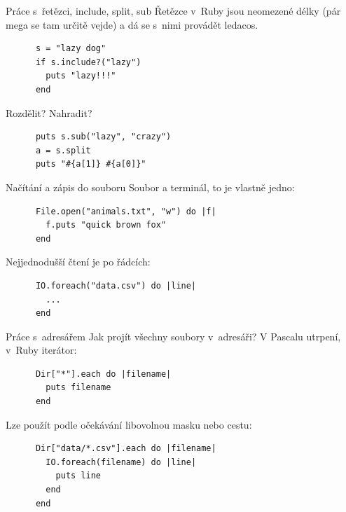 \documentclass{beamer}
\begin{document}
\begin{frame}[fragile]{Práce s~řetězci, include, split, sub}
  Řetězce v~Ruby jsou neomezené délky (pár mega se tam určitě vejde) a dá se s~nimi provádět ledacos.
  \begin{block}{}
    {\scriptsize \begin{verbatim}
      s = "lazy dog"
      if s.include?("lazy")
        puts "lazy!!!"
      end
    \end{verbatim}}
  \end{block}
  \pause
  Rozdělit? Nahradit?
  \begin{block}{}
    {\scriptsize \begin{verbatim}
      puts s.sub("lazy", "crazy")
      a = s.split
      puts "#{a[1]} #{a[0]}"
    \end{verbatim}}
  \end{block}
\end{frame}

\begin{frame}[fragile]{Načítání a zápis do souboru}
  Soubor a terminál, to je vlastně jedno:
  \begin{block}{}
    {\scriptsize \begin{verbatim}
      File.open("animals.txt", "w") do |f|
        f.puts "quick brown fox"
      end
    \end{verbatim}}
  \end{block}
  \pause
  Nejjednodušší čtení je po řádcích:
  \begin{block}{}
    {\scriptsize \begin{verbatim}
      IO.foreach("data.csv") do |line|
        ...
      end
    \end{verbatim}}
  \end{block}
\end{frame}

\begin{frame}[fragile]{Práce s~adresářem}
  Jak projít všechny soubory v~adresáři? V Pascalu utrpení, v~Ruby iterátor:
  \begin{block}{}
    {\scriptsize \begin{verbatim}
      Dir["*"].each do |filename|
        puts filename
      end
    \end{verbatim}}
  \end{block}
  \pause
  Lze použít podle očekávání libovolnou masku nebo cestu:
  \begin{block}{}
    {\scriptsize \begin{verbatim}
      Dir["data/*.csv"].each do |filename|
        IO.foreach(filename) do |line|
          puts line
        end
      end
    \end{verbatim}}
  \end{block}
\end{frame}
\end{document}
